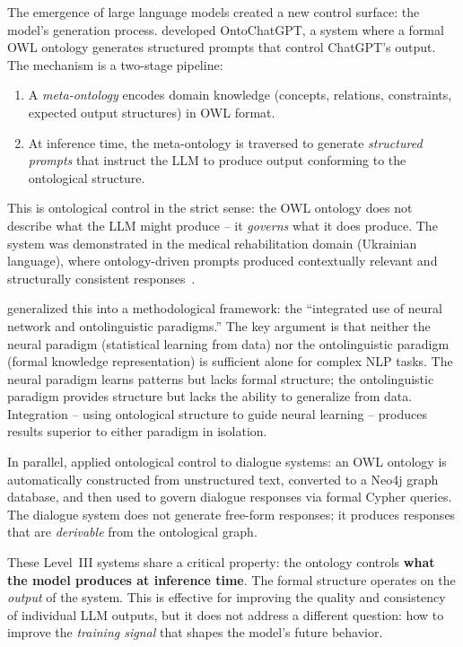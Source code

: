 \documentclass[11pt]{article}
\begin{document}
The emergence of large language models created a new control surface: the model's generation process.
\citet{palagin2023ontochatgpt} developed OntoChatGPT, a system where a formal OWL ontology generates structured prompts that control ChatGPT's output.
The mechanism is a two-stage pipeline:

\begin{enumerate}[nosep]
  \item A \emph{meta-ontology} encodes domain knowledge (concepts, relations, constraints, expected output structures) in OWL format.
  \item At inference time, the meta-ontology is traversed to generate \emph{structured prompts} that instruct the LLM to produce output conforming to the ontological structure.
\end{enumerate}

This is ontological control in the strict sense: the OWL ontology does not describe what the LLM might produce -- it \emph{governs} what it does produce.
The system was demonstrated in the medical rehabilitation domain (Ukrainian language), where ontology-driven prompts produced contextually relevant and structurally consistent responses~\citep{palagin2023ontochatgpt}.

\citet{palagin2024neural} generalized this into a methodological framework: the ``integrated use of neural network and ontolinguistic paradigms.''
The key argument is that neither the neural paradigm (statistical learning from data) nor the ontolinguistic paradigm (formal knowledge representation) is sufficient alone for complex NLP tasks.
The neural paradigm learns patterns but lacks formal structure; the ontolinguistic paradigm provides structure but lacks the ability to generalize from data.
Integration -- using ontological structure to guide neural learning -- produces results superior to either paradigm in isolation.

In parallel, \citet{palagin2023dialogue} applied ontological control to dialogue systems: an OWL ontology is automatically constructed from unstructured text, converted to a Neo4j graph database, and then used to govern dialogue responses via formal Cypher queries.
The dialogue system does not generate free-form responses; it produces responses that are \emph{derivable} from the ontological graph.

These Level~III systems share a critical property: the ontology controls \textbf{what the model produces at inference time}.
The formal structure operates on the \emph{output} of the system.
This is effective for improving the quality and consistency of individual LLM outputs, but it does not address a different question: how to improve the \emph{training signal} that shapes the model's future behavior.
\end{document}
